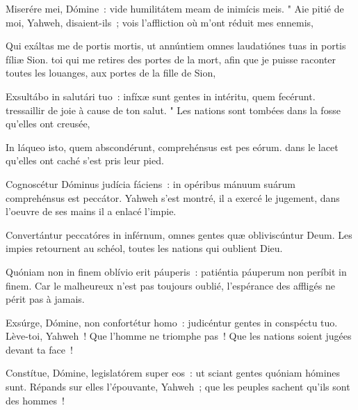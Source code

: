 
\begin{paracol}{2}

\LigneParacol{0cm}
{Miserére mei, Dómine~: \GreStar{} vide humilitátem meam de inimícis meis.}
{" Aie pitié de moi, Yahweh, disaient-ils~; vois l'affliction où m'ont réduit mes ennemis,}

\LigneParacol{0.2cm}
{Qui exáltas me de portis mortis, \GreStar{} ut annúntiem omnes laudatiónes tuas in portis fíliæ Sion.}
{toi qui me retires des portes de la mort, afin que je puisse raconter toutes les louanges, aux portes de la fille de Sion,}

\LigneParacol{0.2cm}
{Exsultábo in salutári tuo~: \GreStar{} infíxæ sunt gentes in intéritu, quem fecérunt.}
{tressaillir de joie à cause de ton salut. " Les nations sont tombées dans la fosse qu'elles ont creusée,}

\LigneParacol{0.2cm}
{In láqueo isto, quem abscondérunt, \GreStar{} comprehénsus est pes eórum.}
{dans le lacet qu'elles ont caché s'est pris leur pied.}

\LigneParacol{0.2cm}
{Cognoscétur Dóminus judícia fá\-ciens~: \GreStar{} in opéribus mánuum suárum comprehénsus est peccátor.}
{Yahweh s'est montré, il a exercé le jugement, dans l'oeuvre de ses mains il a enlacé l'impie.}

\LigneParacol{0.2cm}
{Convertántur peccatóres in inférnum, \GreStar{} omnes gentes quæ obliviscúntur Deum.}
{Les impies retournent au schéol, toutes les nations qui oublient Dieu.}

\LigneParacol{0.2cm}
{Quóniam non in finem oblívio erit páuperis~: \GreStar{} patiéntia páuperum non períbit in finem.}
{Car le malheureux n'est pas toujours oublié, l'espérance des affligés ne périt pas à jamais. }

\LigneParacol{0.2cm}
{Exsúrge, Dómine, non confortétur homo~: \GreStar{} judicéntur gentes in conspéctu tuo.}
{Lève-toi, Yahweh~! Que l'homme ne triomphe pas~! Que les nations soient jugées devant ta face~! }

\LigneParacol{0.2cm}
{Constítue, Dómine, legislatórem super eos~: \GreStar{} ut sciant gentes quóniam hómines sunt.}
{Répands sur elles l'épouvante, Yahweh~; que les peuples sachent qu'ils sont des hommes~!}

\end{paracol}
\Gloria

